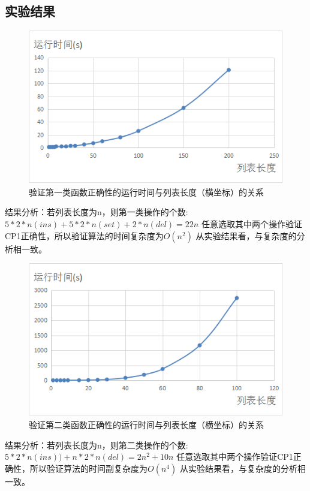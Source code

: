 \subsection{实验结果}
\begin{figure}[H]
\centering
\includegraphics{figures/runtime1.bmp}
\caption{验证第一类函数正确性的运行时间与列表长度（横坐标）的关系}
\end{figure}
\par 结果分析：若列表长度为n，则第一类操作的个数:$5*2*n(ins)+5*2*n(set)+2*n(del) = 22n$
任意选取其中两个操作验证CP1正确性，所以验证算法的时间复杂度为$O(n^2)$
从实验结果看，与复杂度的分析相一致。

\begin{figure}[H]
\centering
\includegraphics{figures/runtime2.bmp}
\caption{验证第二类函数正确性的运行时间与列表长度（横坐标）的关系}
\end{figure}
\par 结果分析：若列表长度为n，则第二类操作的个数:$5*2*n(ins))+n*2*n(del) = 2n^2+10n$
任意选取其中两个操作验证CP1正确性，所以验证算法的时间副复杂度为$O(n^4)$
从实验结果看，与复杂度的分析相一致。

